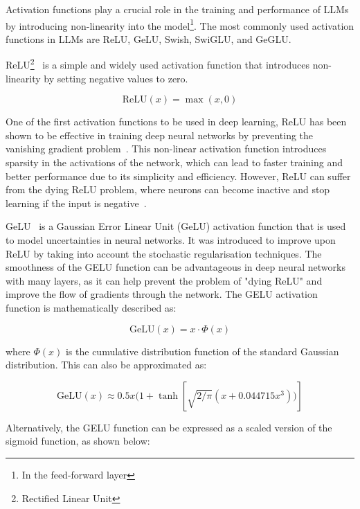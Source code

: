 Activation functions play a crucial role in the training and performance of LLMs by introducing non-linearity into the model\footnote{In the feed-forward layer}.
The most commonly used activation functions in LLMs are ReLU, GeLU, Swish, SwiGLU, and GeGLU\@.

ReLU\footnote{Rectified Linear Unit}~\cite{nair2010rectified} is a simple and widely used activation function that introduces non-linearity by setting negative values to zero.

\begin{equation}
	\text{ReLU}(x) = \max(x, 0)
	\label{eq:relu}
\end{equation}

One of the first activation functions to be used in deep learning, ReLU has been shown to be effective in training deep neural networks by preventing the vanishing gradient problem~\cite{glorot2011deep}.
This non-linear activation function introduces sparsity in the activations of the network, which can lead to faster training and better performance due to its simplicity and efficiency.
However, ReLU can suffer from the dying ReLU problem, where neurons can become inactive and stop learning if the input is negative~\cite{maas2013rectifier}.

GeLU~\cite{hendrycks2016gaussian} is a Gaussian Error Linear Unit (GeLU) activation function that is used to model uncertainties in neural networks.
It was introduced to improve upon ReLU by taking into account the stochastic regularisation techniques.
The smoothness of the GELU function can be advantageous in deep neural networks with many layers, as it can help prevent the problem of "dying ReLU" and improve the flow of gradients through the network.
The GELU activation function is mathematically described as:

\begin{equation}
	\text{GeLU}(x) = x \cdot \Phi(x)
	\label{eq:geluf}
\end{equation}

\noindent where \(\Phi(x)\) is the cumulative distribution function of the standard Gaussian distribution.
This can also be approximated as:

\begin{equation}
	\text{GeLU}(x) \approx 0.5x(1 + \tanh[\sqrt{2/\pi}(x + 0.044715x^3))]
	\label{eq:geluapprox1}
\end{equation}

Alternatively, the GELU function can be expressed as a scaled version of the sigmoid function, as shown below:

